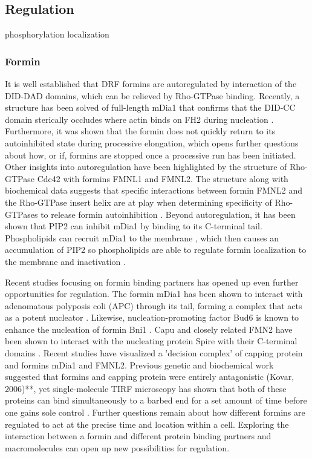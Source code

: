 \subsection{Regulation}\label{ena-formin-regulation}
phosphorylation
localization


\subsubsection{Formin}

It is well established that DRF formins are autoregulated by interaction of the DID-DAD domains, which can be relieved by Rho-GTPase binding. Recently, a structure has been solved of full-length mDia1 that confirms that the DID-CC domain sterically occludes where actin binds on FH2 during nucleation \citep{maiti_structure_2012}. Furthermore, it was shown that the formin does not quickly return to its autoinhibited state during processive elongation, which opens further questions about how, or if, formins are stopped once a processive run has been initiated. Other insights into autoregulation have been highlighted by the structure of Rho-GTPase Cdc42 with formins FMNL1 and FMNL2. The structure along with biochemical data suggests that specific interactions between formin FMNL2 and the Rho-GTPase insert helix are at play when determining specificity of Rho-GTPases to release formin autoinhibition \citep{kuhn_structure_2015}. Beyond autoregulation, it has been shown that PIP2 can inhibit mDia1 by binding to its C-terminal tail. Phospholipids can recruit mDia1 to the membrane \citep{van_gisbergen_class_2012}, which then causes an accumulation of PIP2 so phospholipids are able to regulate formin localization to the membrane and inactivation \citep{ramalingam_phospholipids_2010}. 

Recent studies focusing on formin binding partners has opened up even further opportunities for regulation. The formin mDia1 has been shown to interact with adenomatous polyposis coli (APC) through its tail, forming a complex that acts as a potent nucleator \citep{breitsprecher_rocket_2012,okada_adenomatous_2010}. Likewise, nucleation-promoting factor Bud6 is known to enhance the nucleation of formin Bni1 \citep{moseley_differential_2005}. Capu and closely related FMN2 have been shown to interact with the nucleating protein Spire with their C-terminal domains \citep{montaville_role_2016,montaville_spire_2014,pechlivanis_identification_2009,vizcarra_structure_2011}. Recent studies have visualized a 'decision complex' of capping protein and formins mDia1 and FMNL2. Previous genetic and biochemical work suggested that formins and capping protein were entirely antagonistic (Kovar, 2006)**, yet single-molecule TIRF microscopy has shown that both of these proteins can bind simultaneously to a barbed end for a set amount of time before one gains sole control \citep{bombardier_single-molecule_2015,shekhar_formin_2015}. Further questions remain about how different formins are regulated to act at the precise time and location within a cell. Exploring the interaction between a formin and different protein binding partners and macromolecules can open up new possibilities for regulation.

